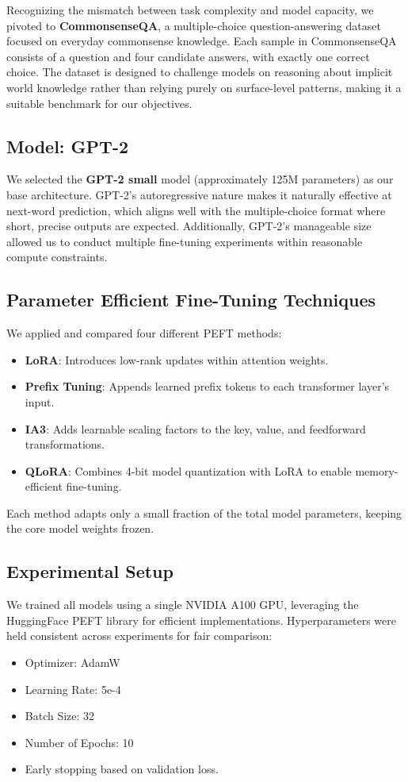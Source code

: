\documentclass[11pt,twocolumn]{article}
\begin{document}
Recognizing the mismatch between task complexity and model capacity, we pivoted to \textbf{CommonsenseQA}, a multiple-choice question-answering dataset focused on everyday commonsense knowledge. Each sample in CommonsenseQA consists of a question and four candidate answers, with exactly one correct choice. The dataset is designed to challenge models on reasoning about implicit world knowledge rather than relying purely on surface-level patterns, making it a suitable benchmark for our objectives.

\subsection{Model: GPT-2}
We selected the \textbf{GPT-2 small} model (approximately 125M parameters) as our base architecture. GPT-2's autoregressive nature makes it naturally effective at next-word prediction, which aligns well with the multiple-choice format where short, precise outputs are expected. Additionally, GPT-2's manageable size allowed us to conduct multiple fine-tuning experiments within reasonable compute constraints.

\subsection{Parameter Efficient Fine-Tuning Techniques}
We applied and compared four different PEFT methods:
\begin{itemize}
    \item \textbf{LoRA}: Introduces low-rank updates within attention weights.
    \item \textbf{Prefix Tuning}: Appends learned prefix tokens to each transformer layer’s input.
    \item \textbf{IA3}: Adds learnable scaling factors to the key, value, and feedforward transformations.
    \item \textbf{QLoRA}: Combines 4-bit model quantization with LoRA to enable memory-efficient fine-tuning.
\end{itemize}
Each method adapts only a small fraction of the total model parameters, keeping the core model weights frozen.

\subsection{Experimental Setup}
We trained all models using a single NVIDIA A100 GPU, leveraging the HuggingFace PEFT library for efficient implementations. Hyperparameters were held consistent across experiments for fair comparison:
\begin{itemize}
    \item Optimizer: AdamW
    \item Learning Rate: 5e-4
    \item Batch Size: 32
    \item Number of Epochs: 10
    \item Early stopping based on validation loss.
\end{itemize}
\end{document}

